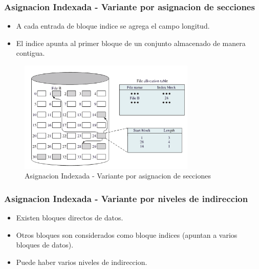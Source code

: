 \documentclass[12pt]{article}
\begin{document}
\subsubsection{Asignacion Indexada - Variante por asignacion de secciones}
\begin{itemize}
    \item A cada entrada de bloque indice se agrega el campo longitud.
    \item El indice apunta al primer bloque de un conjunto almacenado de manera contigua.
\end{itemize}


\vspace{-8em}

\begin{figure}[ht]
    \begin{center}
        \includegraphics[width=0.75\textwidth]{assets/IndexadaSecciones.pdf}
    \end{center}
    \caption{Asignacion Indexada - Variante por asignacion de secciones}
    \label{fig:6}
\end{figure}

\pagebreak

\subsubsection{Asignacion Indexada - Variante por niveles de indireccion}
\begin{itemize}
    \item Existen bloques directos de datos.
    \item Otros bloques son considerados como bloque indices (apuntan a varios bloques de datos).
    \item Puede haber varios niveles de indireccion.
\end{itemize}
\end{document}
